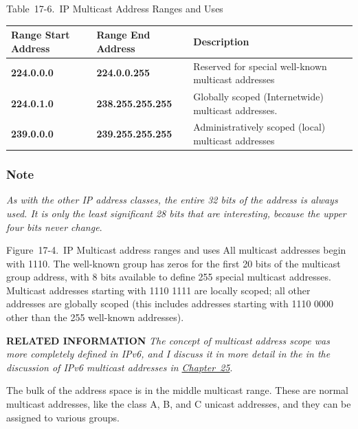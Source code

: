 \documentclass[b5paper,11pt]{memoir}
\begin{document}
\protect\hypertarget{ch17s06.htmlux5cux23ip_multicast_address_ranges_and_uses}{}{}

Table~17-6.~IP Multicast Address Ranges and Uses

\begin{longtable}[]{@{}lll@{}}
\toprule
Range Start Address & Range End Address & Description\tabularnewline
\midrule
\endhead
{\textbf{224.0.0.0}} & {\textbf{224.0.0.255}} & Reserved for special
well-known multicast addresses\tabularnewline
{\textbf{224.0.1.0}} & {\textbf{238.255.255.255}} & Globally scoped
(Internetwide) multicast addresses.\tabularnewline
{\textbf{239.0.0.0}} & {\textbf{239.255.255.255}} & Administratively
scoped (local) multicast addresses\tabularnewline
\bottomrule
\end{longtable}

\subsubsection[Note]{\texorpdfstring{\protect\hypertarget{ch17s06.htmlux5cux23note-68}{}{}Note}{Note}}

{\emph{As with the other IP address classes, the entire 32 bits of the
address is always used. It is only the least significant 28 bits that
are interesting, because the upper four bits never change}}.

\protect\hypertarget{ch17s06.htmlux5cux23ip_multicast_address_ranges_and_uses_all}{}{}

\protect\hypertarget{ch17s06.htmlux5cux23I_mediaobject3_d1e17790}{}{}

Figure~17-4.~IP Multicast address ranges and uses All multicast
addresses begin with 1110. The well-known group has zeros for the first
20 bits of the multicast group address, with 8 bits available to define
255 special multicast addresses. Multicast addresses starting with 1110
1111 are locally scoped; all other addresses are globally scoped (this
includes addresses starting with 1110 0000 other than the 255 well-known
addresses).


{\textbf{RELATED INFORMATION}} {\emph{The concept of multicast address
scope was more completely defined in IPv6, and I discuss it in more
detail in the in the discussion of IPv6 multicast addresses in
\protect\hyperlink{ch25.html}{Chapter~25}}}.

The bulk of the address space is in the middle multicast range. These
are normal multicast addresses, like the class A, B, and C unicast
addresses, and they can be assigned to various groups.
\end{document}

